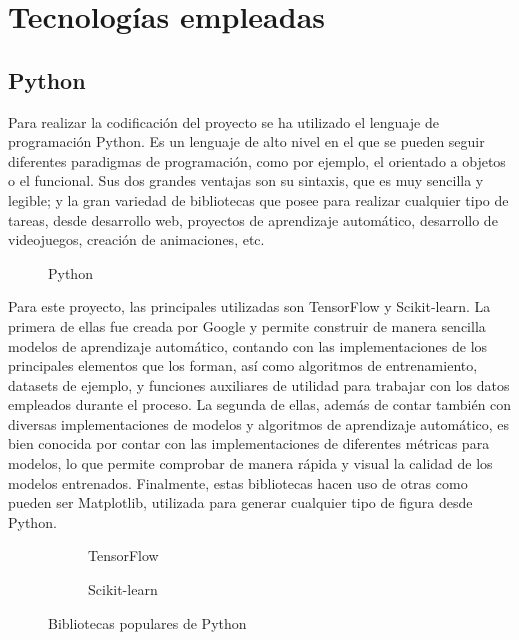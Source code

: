 	\section{Tecnologías empleadas}
	
		\subsection{Python}
		
			Para realizar la codificación del proyecto se ha utilizado el lenguaje de programación Python. Es un lenguaje de alto nivel en el que se pueden seguir diferentes paradigmas de programación, como por ejemplo, el orientado a objetos o el funcional. Sus dos grandes ventajas son su sintaxis, que es muy sencilla y legible; y la gran variedad de bibliotecas que posee para realizar cualquier tipo de tareas, desde desarrollo web, proyectos de aprendizaje automático, desarrollo de videojuegos, creación de animaciones, etc. \\
			
			\begin{figure}[!h]
				\centering
				
				\caption{Python}
				\label{fig:py}
			\end{figure}
			
			Para este proyecto, las principales utilizadas son TensorFlow y Scikit-learn. La primera de ellas fue creada por Google y permite construir de manera sencilla modelos de aprendizaje automático, contando con las implementaciones de los principales elementos que los forman, así como algoritmos de entrenamiento, datasets de ejemplo, y funciones auxiliares de utilidad para trabajar con los datos empleados durante el proceso. La segunda de ellas, además de contar también con diversas implementaciones de modelos y algoritmos de aprendizaje automático, es bien conocida por contar con las implementaciones de diferentes métricas para modelos, lo que permite comprobar de manera rápida y visual la calidad de los modelos entrenados. Finalmente, estas bibliotecas hacen uso de otras como pueden ser Matplotlib, utilizada para generar cualquier tipo de figura desde Python. \\
			
			\begin{figure}[!h]
				\centering
				\begin{subfigure}{.5\textwidth}
					\centering
					
					\caption{TensorFlow}
					\label{fig:tf}
				\end{subfigure}\hfill
				\begin{subfigure}{.5\textwidth}
					\centering
					
					\caption{Scikit-learn}
					\label{fig:sklearn}
				\end{subfigure}
				\caption{Bibliotecas populares de Python}
				\label{fig:bibliotecas}
			\end{figure}
			
